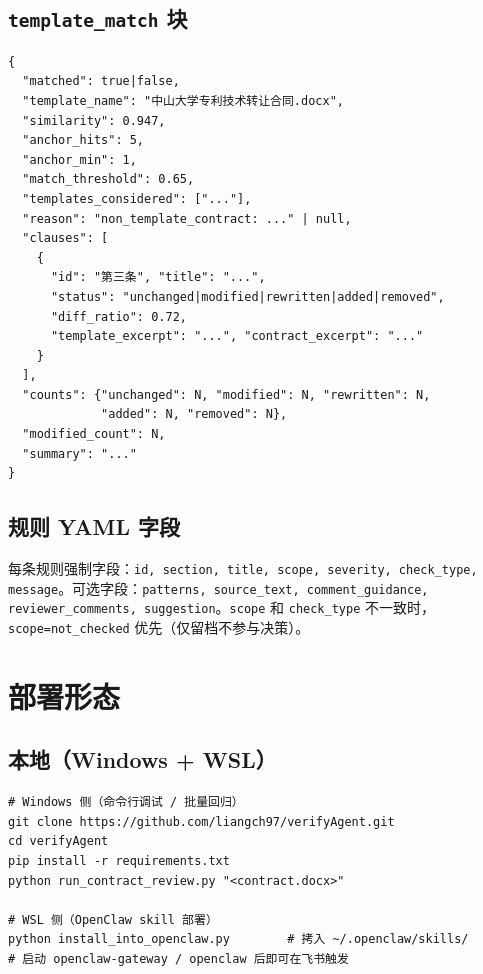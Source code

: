 \documentclass[11pt,a4paper]{article}
\begin{document}
\subsection{\texttt{template\_match} 块}

\begin{lstlisting}[style=json]
{
  "matched": true|false,
  "template_name": "中山大学专利技术转让合同.docx",
  "similarity": 0.947,
  "anchor_hits": 5,
  "anchor_min": 1,
  "match_threshold": 0.65,
  "templates_considered": ["..."],
  "reason": "non_template_contract: ..." | null,
  "clauses": [
    {
      "id": "第三条", "title": "...",
      "status": "unchanged|modified|rewritten|added|removed",
      "diff_ratio": 0.72,
      "template_excerpt": "...", "contract_excerpt": "..."
    }
  ],
  "counts": {"unchanged": N, "modified": N, "rewritten": N,
             "added": N, "removed": N},
  "modified_count": N,
  "summary": "..."
}
\end{lstlisting}

\subsection{规则 YAML 字段}

每条规则强制字段：\texttt{id, section, title, scope, severity, check\_type,
message}。可选字段：\texttt{patterns, source\_text, comment\_guidance,
reviewer\_comments, suggestion}。\texttt{scope} 和 \texttt{check\_type}
不一致时，\texttt{scope=not\_checked} 优先（仅留档不参与决策）。

\section{部署形态}

\subsection{本地（Windows + WSL）}

\begin{lstlisting}[style=shell]
# Windows 侧（命令行调试 / 批量回归）
git clone https://github.com/liangch97/verifyAgent.git
cd verifyAgent
pip install -r requirements.txt
python run_contract_review.py "<contract.docx>"

# WSL 侧（OpenClaw skill 部署）
python install_into_openclaw.py        # 拷入 ~/.openclaw/skills/
# 启动 openclaw-gateway / openclaw 后即可在飞书触发
\end{lstlisting}
\end{document}
